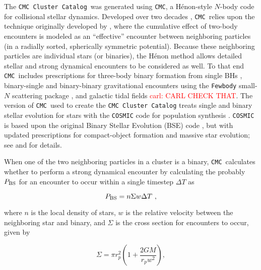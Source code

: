 \documentclass[twocolumn]{aastex631}
\newcommand{\CMC}{\texttt{CMC}}
\newcommand{\CMCcat}{\texttt{CMC Cluster Catalog}}
\newcommand{\carl}[1]{\textcolor{red}{carl: #1}}
\begin{document}
The \CMCcat\ was generated using \CMC, a H\'enon-style $N$-body code for collisional stellar dynamics.  Developed over two decades \citep{2000ApJ...540..969J,2013ApJS..204...15P,Rodriguez2022}, \CMC\ relies upon the technique originally developed by \cite{1971Ap&SS..13..284H,1971Ap&SS..14..151H}, where the cumulative effect of two-body encounters is modeled as an ``effective'' encounter between neighboring particles (in a radially sorted, spherically symmetric  potential).  Because these neighboring particles are individual stars (or binaries), the H\'enon method allows detailed stellar and strong dynamical encounters to be considered as well. To that end \CMC~includes prescriptions for three-body binary formation from single BHs \cite{2013ApJ...763L..15M}, binary-single and binary-binary gravitational encounters using the \texttt{Fewbody} small-$N$ scattering package \cite{2004MNRAS.352....1F,2007ApJ...658.1047F}, and galactic tidal fields \cite{2013MNRAS.429.2881C} \carl{CARL CHECK THAT}.  The version of \CMC~used to create the \CMCcat\citep[which used identical physics to the public version described in][]{Rodriguez2022} treats single and binary stellar evolution for stars with  the \texttt{COSMIC} code for population synthesis \citep{2020ApJ...898...71B}.  \texttt{COSMIC} is based upon the original Binary Stellar Evolution (BSE) code \citep{2000MNRAS.315..543H,2002MNRAS.329..897H}, but with updated prescriptions for compact-object formation and massive star evolution; see \cite{2020ApJ...898...71B} and \cite{Rodriguez2022} for details.

When one of the two neighboring particles in a cluster is a binary, \CMC\ calculates whether to perform a strong dynamical encounter by calculating the probably $P_{\rm BS}$ for an encounter to occur within a single timestep $\Delta T$ as

\begin{equation}
P_{\rm BS} = n \Sigma w \Delta T~,
\label{eqn:pbs}
\end{equation}

\noindent where $n$ is the local density of stars, $w$ is the relative velocity between the neighboring star and binary, and $\Sigma$ is the cross section for encounters to occur, given by

\begin{equation}
\Sigma = \pi r_p^2 \left(1+\frac{2 G M}{r_p w^2}\right),
\label{eqn:sigma}
\end{equation}
\end{document}
